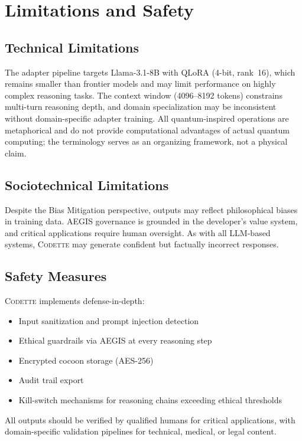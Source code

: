 \documentclass[11pt,a4paper]{article}
\newcommand{\codette}{\textsc{Codette}}
\begin{document}
\section{Limitations and Safety}
\label{sec:limitations}

\subsection{Technical Limitations}
The adapter pipeline targets Llama-3.1-8B with QLoRA (4-bit, rank~16), which remains smaller than frontier models and may limit performance on highly complex reasoning tasks. The context window (4096--8192 tokens) constrains multi-turn reasoning depth, and domain specialization may be inconsistent without domain-specific adapter training. All quantum-inspired operations are metaphorical and do not provide computational advantages of actual quantum computing; the terminology serves as an organizing framework, not a physical claim.

\subsection{Sociotechnical Limitations}
Despite the Bias Mitigation perspective, outputs may reflect philosophical biases in training data. AEGIS governance is grounded in the developer's value system, and critical applications require human oversight. As with all LLM-based systems, \codette{} may generate confident but factually incorrect responses.

\subsection{Safety Measures}
\codette{} implements defense-in-depth:
\begin{itemize}[leftmargin=*]
  \item Input sanitization and prompt injection detection
  \item Ethical guardrails via AEGIS at every reasoning step
  \item Encrypted cocoon storage (AES-256)
  \item Audit trail export
  \item Kill-switch mechanisms for reasoning chains exceeding ethical thresholds
\end{itemize}
All outputs should be verified by qualified humans for critical applications, with domain-specific validation pipelines for technical, medical, or legal content.
\end{document}
